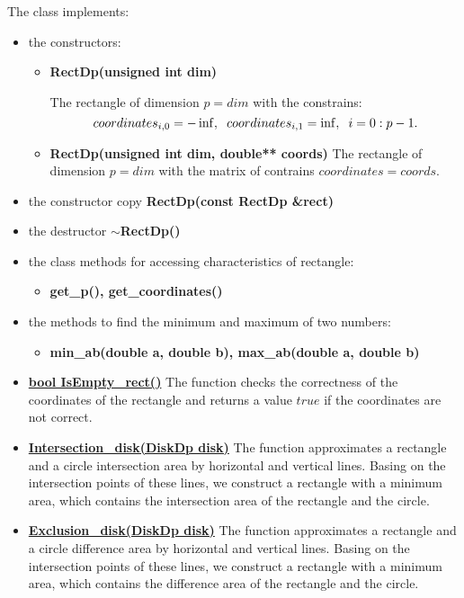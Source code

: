 \documentclass{report}
\begin{document}
	The class implements:
	\begin{itemize}	
		\item the constructors:
		\begin{itemize}
			\item {\bfseries RectDp(unsigned int dim)} 
			
			The rectangle of dimension $p = dim$ with the constrains: 
			\begin{equation*}
			coordinates_{i,0}= -\inf, \hspace*{2mm} coordinates_{i,1} = \inf,\hspace*{2mm} i = 0:p-1. 
			\end{equation*}
			\item {\bfseries RectDp(unsigned int dim, double** coords)} 
			The rectangle of dimension $p = dim$ with the matrix of contrains $coordinates = coords$.
		\end{itemize}
		
		\item the constructor copy {\bfseries  RectDp(const RectDp \&rect)} 
		\item the destructor {\bfseries  $\sim$RectDp()}
		\item the class methods for accessing characteristics of rectangle:
		\begin{itemize}
			\item {\bfseries get\_p(), get\_coordinates()}	
		\end{itemize}
		\item the methods  to find the minimum and maximum of two numbers:
		\begin{itemize}
			\item {\bfseries min\_ab(double a, double b), max\_ab(double a, double b)}
		\end{itemize}
		 \item \hyperref [Empty]{\bfseries bool IsEmpty\_rect()} 
		 The function checks the correctness of the coordinates of the rectangle and returns a  value $true$ if the coordinates are not correct.
		 \item \hyperref [Intersection]{\bfseries Intersection\_disk(DiskDp disk)} 
		 The function approximates a rectangle and a circle intersection area by horizontal and vertical lines. Basing on the intersection points of these lines, we construct a rectangle with a minimum area, which contains the intersection area of the rectangle and the circle.
		 \item \hyperref [Difference]{\bfseries Exclusion\_disk(DiskDp disk)} 
		 The function approximates a rectangle and a circle difference area by horizontal and vertical lines. Basing on the intersection points of these lines, we construct a rectangle with a minimum area, which contains the difference area of the rectangle and the circle.	 
	\end{itemize} 
\end{document}
